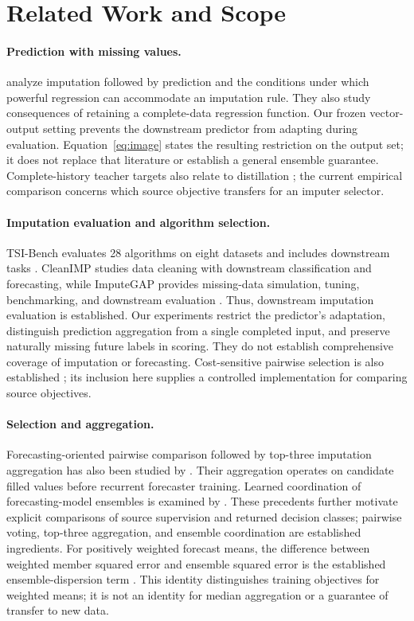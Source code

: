 \documentclass{article}
\begin{document}
\section{Related Work and Scope}

\paragraph{Prediction with missing values.}
\citet{lemorvan2021good} analyze imputation followed by prediction and the conditions under which powerful regression can accommodate an imputation rule. They also study consequences of retaining a complete-data regression function. Our frozen vector-output setting prevents the downstream predictor from adapting during evaluation. Equation~\ref{eq:image} states the resulting restriction on the output set; it does not replace that literature or establish a general ensemble guarantee. Complete-history teacher targets also relate to distillation \citep{menon2021statistical}; the current empirical comparison concerns which source objective transfers for an imputer selector.

\paragraph{Imputation evaluation and algorithm selection.}
TSI-Bench evaluates 28 algorithms on eight datasets and includes downstream tasks \citep{du2024tsibench}. CleanIMP studies data cleaning with downstream classification and forecasting, while ImputeGAP provides missing-data simulation, tuning, benchmarking, and downstream evaluation \citep{cleanimp,nater2025imputegap}. Thus, downstream imputation evaluation is established. Our experiments restrict the predictor's adaptation, distinguish prediction aggregation from a single completed input, and preserve naturally missing future labels in scoring. They do not establish comprehensive coverage of imputation or forecasting. Cost-sensitive pairwise selection is also established \citep{xu2012evaluating}; its inclusion here supplies a controlled implementation for comparing source objectives.

\paragraph{Selection and aggregation.}
Forecasting-oriented pairwise comparison followed by top-three imputation aggregation has also been studied by \citet{utama2026duel}. Their aggregation operates on candidate filled values before recurrent forecaster training. Learned coordination of forecasting-model ensembles is examined by \citet{cao2025conversational}. These precedents further motivate explicit comparisons of source supervision and returned decision classes; pairwise voting, top-three aggregation, and ensemble coordination are established ingredients.
For positively weighted forecast means, the difference between weighted member squared error and ensemble squared error is the established ensemble-dispersion term \citep{krogh1994ensembles}. This identity distinguishes training objectives for weighted means; it is not an identity for median aggregation or a guarantee of transfer to new data.
\end{document}
